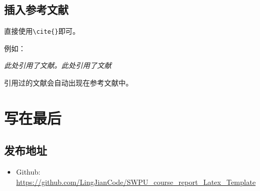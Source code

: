 \documentclass[12pt,hyperref,a4paper,UTF8]{ctexart}
\begin{document}
%
%
%
%
%
%

\subsection{插入参考文献}
直接使用\verb|\cite{}|即可。

例如：


   \textit{ 此处引用了文献\cite{0Isaac}。此处引用了文献\cite{2016The}}


引用过的文献会自动出现在参考文献中。

\section{写在最后}
\subsection{发布地址}
\begin{itemize}
    \item Github: \url{https://github.com/LingJianCode/SWPU_course_report_Latex_Template}
\end{itemize}


\end{document}
